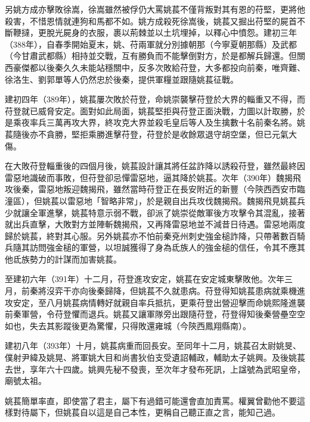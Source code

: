 另姚方成亦擊敗徐嵩，徐嵩雖然被俘仍大罵姚萇不僅背叛對其有恩的苻堅，更將他殺害，不惜恩情就連狗和馬都不如。姚方成殺死徐嵩後，姚萇又掘出苻堅的屍首不斷鞭撻，更脫光屍身的衣服，裹以荊棘並以土坑埋掉，以釋心中憤怨。建初三年（388年），自春季開始夏末，姚、苻兩軍就分別據朝那（今寧夏朝那縣）及武都（今甘肅武都縣）相持並交戰，互有勝負而不能擊倒對方，於是都解兵歸還。但關西豪傑都以後秦久久未能站穩關中，反多次敗給苻登，大多都投向前秦，唯齊難、徐洛生、劉郭單等人仍然忠於後秦，提供軍糧並跟隨姚萇征戰。

建初四年（389年），姚萇屢次敗於苻登，命姚崇襲擊苻登於大界的輜重又不得，而苻登就已威脅安定。面對如此局面，姚萇堅拒與苻登正面決戰，力圖以計取勝，於是乘夜率兵三萬再攻大界，終攻克大界並殺毛皇后等人及生擒數十名前秦名將。姚萇隨後亦不貪勝，堅拒乘勝進擊苻登，苻登於是收餘眾退守胡空堡，但已元氣大傷。

在大敗苻登輜重後的四個月後，姚萇設計讓其將任盆詐降以誘殺苻登，雖然最終因雷惡地識破而事敗，但苻登卻忌憚雷惡地，逼其降於姚萇。次年（390年）魏揭飛攻後秦，雷惡地叛迎魏揭飛，雖然當時苻登正在長安附近的新豐（今陝西西安市臨潼區），但姚萇以雷惡地「智略非常」，於是親自出兵攻伐魏揭飛。魏揭飛見姚萇兵少就讓全軍進擊，姚萇特意示弱不戰，卻派了姚崇從敵軍後方攻擊令其混亂，接著就出兵直擊，大敗對方並陣斬魏揭飛，又再降雷惡地並不減昔日待遇。雷惡地兩度歸於姚萇，終對其心服。另外姚萇亦不怕前秦兗州刺史強金槌詐降，只帶著數百騎兵隨其訪問強金槌的軍營，以坦誠獲得了身為氐族人的強金槌的信任，令其不應其他氐族勢力的計謀而加害姚萇。

至建初六年（391年）十二月，苻登進攻安定，姚萇在安定城東擊敗他。次年三月，前秦將沒弈干亦向後秦歸降，但姚萇不久就患病。苻登得知姚萇患病就乘機進攻安定，至八月姚萇病情轉好就親自率兵抵抗，更乘苻登出營迎擊而命姚熙隆進襲前秦軍營，令苻登懼而退兵。姚萇又讓軍隊旁出跟隨苻登，苻登得知後秦營壘空空如也，失去其影蹤後更為驚懼，只得敗還雍城（今陝西鳳翔縣南）。

建初八年（393年）十月，姚萇病重而回長安。至同年十二月，姚萇召太尉姚旻、僕射尹緯及姚晃、將軍姚大目和尚書狄伯支受遺詔輔政，輔助太子姚興。及後姚萇去世，享年六十四歲。姚興先秘不發喪，至次年才發布死訊，上諡號為武昭皇帝，廟號太祖。

姚萇簡單率直，即使當了君主，屬下有過錯可能還會直加責罵。權翼曾勸他不要這樣對待屬下，但姚萇自以這是自己本性，更稱自己聽正直之言，能知己過。

